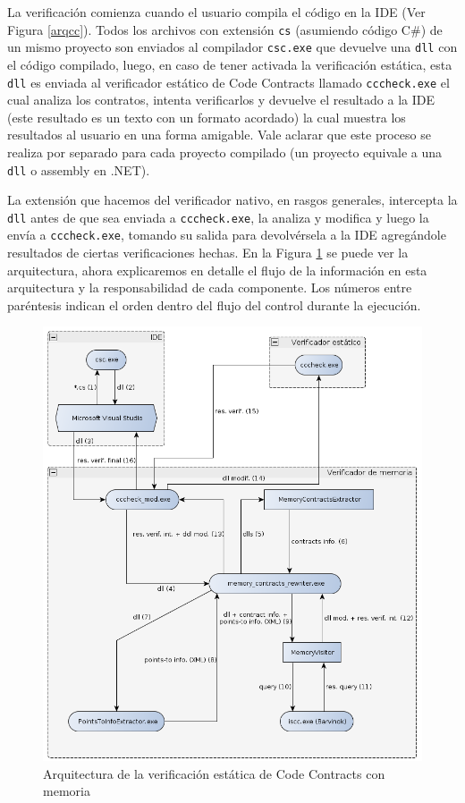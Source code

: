 \documentclass[12pt,a4paper]{article}
\newcommand\mono[1]{\texttt{#1}}
\begin{document}
			 La verificación comienza cuando el usuario compila el código en la IDE (Ver Figura \ref{arqcc}). Todos los archivos con extensión \mono{cs} (asumiendo código C\#) de un mismo proyecto son enviados al compilador \mono{csc.exe} que devuelve una \mono{dll} con el código compilado, luego, en caso de tener activada la verificación estática, esta \mono{dll} es enviada al verificador estático de Code Contracts llamado \mono{cccheck.exe} el cual analiza los contratos, intenta verificarlos y devuelve el resultado a la IDE (este resultado es un texto con un formato acordado) la cual muestra los resultados al usuario en una forma amigable. Vale aclarar que este proceso se realiza por separado para cada proyecto compilado (un proyecto equivale a una \mono{dll} o assembly en .NET).

			La extensión que hacemos del verificador nativo, en rasgos generales, intercepta la \mono{dll} antes de que sea enviada a \mono{cccheck.exe}, la analiza y modifica y luego la envía a \mono{cccheck.exe}, tomando su salida para devolvérsela a la IDE agregándole resultados de ciertas verificaciones hechas. En la Figura \ref{arqccmem} se puede ver la arquitectura, ahora explicaremos en detalle el flujo de la información en esta arquitectura y la responsabilidad de cada componente. Los números entre paréntesis indican el orden dentro del flujo del control durante la ejecución.

			\begin{figure}[htb]
			\begin{center}
			\includegraphics[scale=0.5]{arq_cc_mem.png}
			\end{center}
			\caption{Arquitectura de la verificación estática de Code Contracts con memoria}
			\label{arqccmem}
			\end{figure}
\end{document}

